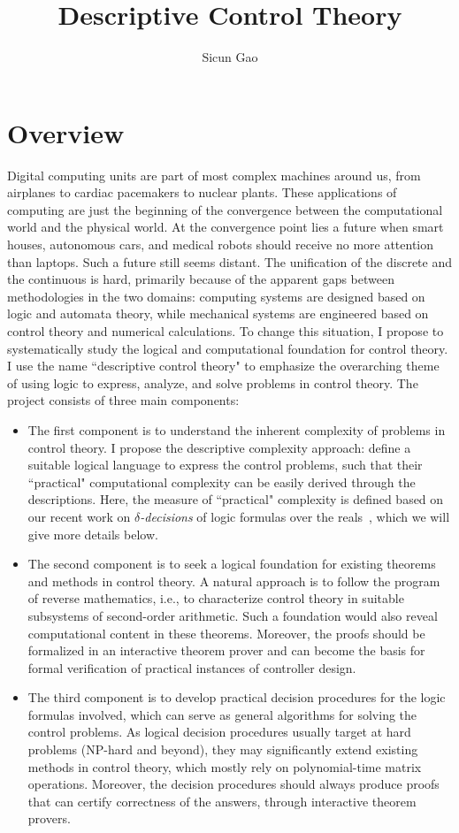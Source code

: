 \documentclass[10pt]{article}
\title{Descriptive Control Theory}
\author{Sicun Gao}
\date{}
\theoremstyle{definition}
\begin{document}
\maketitle
\thispagestyle{empty}

\section{Overview}

Digital computing units are part of most complex machines around us, from airplanes to cardiac pacemakers to nuclear plants. These applications of computing are just the beginning of the convergence between the computational world and the physical world. At the convergence point lies a future when smart houses, autonomous cars, and medical robots should receive no more attention than laptops. Such a future still seems distant. The unification of the discrete and the continuous is hard, primarily because of the apparent gaps between methodologies in the two domains: computing systems are designed based on logic and automata theory, while mechanical systems are engineered based on control theory and numerical calculations. To change this situation, I propose to systematically study the logical and computational foundation for control theory. I use the name ``descriptive control theory" to emphasize the overarching theme of using logic to express, analyze, and solve problems in control theory. The project consists of three main components:
\begin{itemize}
\item The first component is to understand the inherent complexity of problems in control theory. I propose the descriptive complexity approach: define a suitable logical language to express the control problems, such that their ``practical" computational complexity can be easily derived through the descriptions. Here, the measure of ``practical" complexity is defined based on our recent work on {\em $\delta$-decisions} of logic formulas over the reals~\cite{DBLP:conf/lics/GaoAC12,DBLP:conf/cade/GaoAC12}, which we will give more details below. 
\item The second component is to seek a logical foundation for existing theorems and methods in control theory. A natural approach is to follow the program of reverse mathematics, i.e., to characterize control theory in suitable subsystems of second-order arithmetic. Such a foundation would also reveal computational content in these theorems. Moreover, the proofs should be formalized in an interactive theorem prover and can become the basis for formal verification of practical instances of controller design. 
\item The third component is to develop practical decision procedures for the logic formulas involved, which can serve as general algorithms for solving the control problems. As logical decision procedures usually target at hard problems (NP-hard and beyond), they may significantly extend existing methods in control theory, which mostly rely on polynomial-time matrix operations. Moreover, the decision procedures should always produce proofs that can certify correctness of the answers, through interactive theorem provers. 
\end{itemize}
\end{document}
